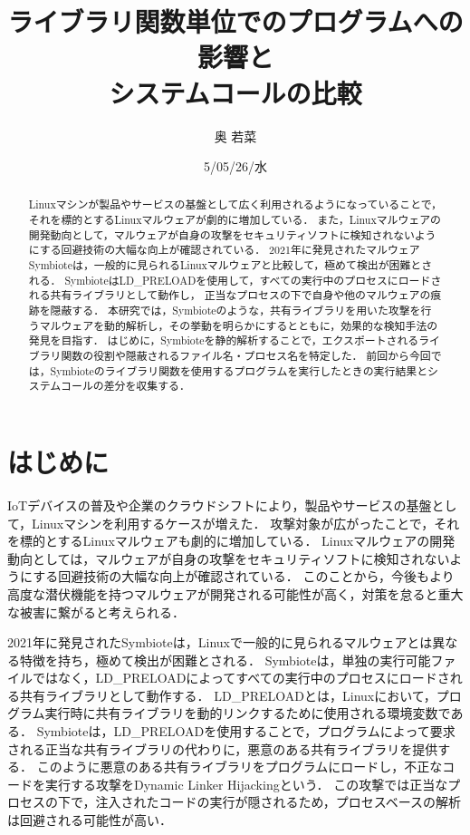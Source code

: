 \documentclass[submit,techreq,noauthor]{eco}	%
\begin{document}
\date   {5/05/26/水}				%
\title  {ライブラリ関数単位でのプログラムへの影響と\\システムコールの比較}	%
\author {奥 若菜}				%


\begin{abstract}
	Linuxマシンが製品やサービスの基盤として広く利用されるようになっていることで，それを標的とするLinuxマルウェアが劇的に増加している．
  また，Linuxマルウェアの開発動向として，マルウェアが自身の攻撃をセキュリティソフトに検知されないようにする回避技術の大幅な向上が確認されている．
  2021年に発見されたマルウェアSymbioteは，一般的に見られるLinuxマルウェアと比較して，極めて検出が困難とされる．
  SymbioteはLD\_PRELOADを使用して，すべての実行中のプロセスにロードされる共有ライブラリとして動作し，
  正当なプロセスの下で自身や他のマルウェアの痕跡を隠蔽する．
  本研究では，Symbioteのような，共有ライブラリを用いた攻撃を行うマルウェアを動的解析し，その挙動を明らかにするとともに，効果的な検知手法の発見を目指す．
  はじめに，Symbioteを静的解析することで，エクスポートされるライブラリ関数の役割や隠蔽されるファイル名・プロセス名を特定した．
  前回から今回では，Symbioteのライブラリ関数を使用するプログラムを実行したときの実行結果とシステムコールの差分を収集する．
\end{abstract}
\maketitle


\section{はじめに}
IoTデバイスの普及や企業のクラウドシフトにより，製品やサービスの基盤として，Linuxマシンを利用するケースが増えた．
攻撃対象が広がったことで，それを標的とするLinuxマルウェアも劇的に増加している\cite{TREND-MICRO}．
Linuxマルウェアの開発動向としては，マルウェアが自身の攻撃をセキュリティソフトに検知されないようにする回避技術の大幅な向上が確認されている\cite{IBM}．
このことから，今後もより高度な潜伏機能を持つマルウェアが開発される可能性が高く，対策を怠ると重大な被害に繋がると考えられる．\cite{A}


2021年に発見されたSymbioteは，Linuxで一般的に見られるマルウェアとは異なる特徴を持ち，極めて検出が困難とされる\cite{Symbiote}．
Symbioteは，単独の実行可能ファイルではなく，LD\_PRELOADによってすべての実行中のプロセスにロードされる共有ライブラリとして動作する．
LD\_PRELOADとは，Linuxにおいて，プログラム実行時に共有ライブラリを動的リンクするために使用される環境変数である．
Symbioteは，LD\_PRELOADを使用することで，プログラムによって要求される正当な共有ライブラリの代わりに，悪意のある共有ライブラリを提供する．
このように悪意のある共有ライブラリをプログラムにロードし，不正なコードを実行する攻撃をDynamic Linker Hijackingという\cite{MITRE-ATT&CK}．
この攻撃では正当なプロセスの下で，注入されたコードの実行が隠されるため，プロセスベースの解析は回避される可能性が高い．
\end{document}

